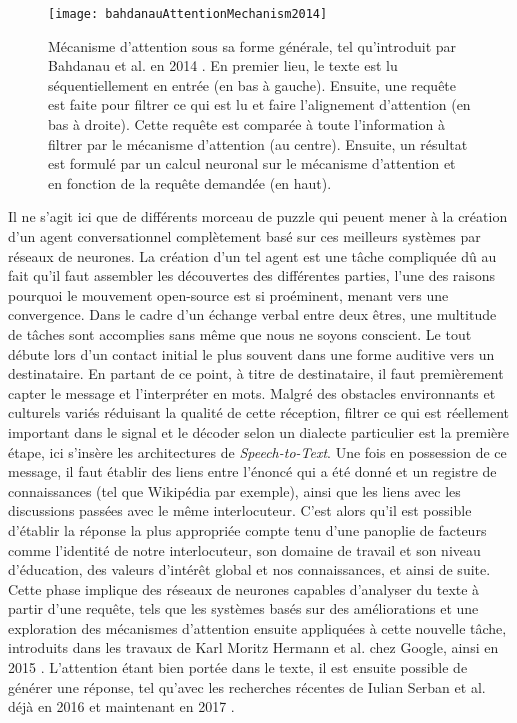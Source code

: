 \begin{figure*}
  \centering
  \texttt{[image: bahdanauAttentionMechanism2014]}
  \caption{Mécanisme d'attention sous sa forme générale, tel qu'introduit par Bahdanau et al. en 2014 \cite{attentionMechanism}. En premier lieu, le texte est lu séquentiellement en entrée (en bas à gauche). Ensuite, une requête est faite pour filtrer ce qui est lu et faire l'alignement d'attention (en bas à droite). Cette requête est comparée à toute l'information à filtrer par le mécanisme d'attention (au centre). Ensuite, un résultat est formulé par un calcul neuronal sur le mécanisme d'attention et en fonction de la requête demandée (en haut).}
  \label{fig:attn}
\end{figure*}

Il ne s'agit ici que de différents morceau de puzzle qui peuent mener à la création d'un agent conversationnel complètement basé sur ces meilleurs systèmes par réseaux de neurones. La création d'un tel agent est une tâche compliquée dû au fait qu'il faut assembler les découvertes des différentes parties, l'une des raisons pourquoi le mouvement open-source est si proéminent, menant vers une convergence. Dans le cadre d'un échange verbal entre deux êtres, une multitude de tâches sont accomplies sans même que nous ne soyons conscient. Le tout débute lors d'un contact initial le plus souvent dans une forme auditive vers un destinataire. En partant de ce point, à titre de destinataire, il faut premièrement capter le message et l'interpréter en mots. Malgré des obstacles environnants et culturels variés réduisant la qualité de cette réception, filtrer ce qui est réellement important dans le signal et le décoder selon un dialecte particulier est la première étape, ici s'insère les architectures de \textit{Speech-to-Text}. Une fois en possession de ce message, il faut établir des liens entre l'énoncé qui a été donné et un registre de connaissances (tel que Wikipédia par exemple), ainsi que les liens avec les discussions passées avec le même interlocuteur. C'est alors qu'il est possible d'établir la réponse la plus appropriée compte tenu d'une panoplie de facteurs comme l'identité de notre interlocuteur, son domaine de travail et son niveau d'éducation, des valeurs d'intérêt global et nos connaissances, et ainsi de suite. Cette phase implique des réseaux de neurones capables d'analyser du texte à partir d'une requête, tels que les systèmes basés sur des améliorations et une exploration des mécanismes d'attention \cite{attentionBasedApproaches} ensuite appliquées à cette nouvelle tâche, introduits dans les travaux de Karl Moritz Hermann et al. chez Google, ainsi en 2015 \cite{readNcomprehend}. L'attention étant bien portée dans le texte, il est ensuite possible de générer une réponse, tel qu'avec les recherches récentes de Iulian Serban et al. déjà en 2016 \cite{chatbot:HRED} et maintenant en 2017 \cite{chatbot:LVHRED}.\\

